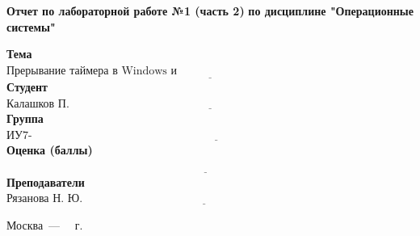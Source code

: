 \begin{titlepage}
	
	\begin{center}
		\Large\textbf{  Отчет по лабораторной работе №1 (часть 2)}\newline
		\textbf{по дисциплине "Операционные системы"}\newline\newline
	\end{center}
	
\noindent\textbf{Тема} $\underline{\text{Прерывание таймера в Windows и Unix~~~~~~~~~~~~~~~~~~~~~~~~~~~~~~~~~~~~~~~~~~~~~~~~~~~~~~~~~~~~~~~~~~~~}}$\newline\newline
\noindent\textbf{Студент} $\underline{\text{Калашков П. А.~~~~~~~~~~~~~~~~~~~~~~~~~~~~~~~~~~~~~~~~~~~~~~~~~~~~~~~~~~~~~~~~~~~~~~~~~~~~~~~~~~~~~~~~~~~~~~~}}$\newline\newline
\noindent\textbf{Группа} $\underline{\text{ИУ7-56Б~~~~~~~~~~~~~~~~~~~~~~~~~~~~~~~~~~~~~~~~~~~~~~~~~~~~~~~~~~~~~~~~~~~~~~~~~~~~~~~~~~~~~~~~~~~~~~~~~~~~~~~~~~~}}$\newline\newline
\noindent\textbf{Оценка (баллы)} $\underline{\text{~~~~~~~~~~~~~~~~~~~~~~~~~~~~~~~~~~~~~~~~~~~~~~~~~~~~~~~~~~~~~~~~~~~~~~~~~~~~~~~~~~~~~~~~~~~~~~~~~~~~~~~~~~}}$\newline\newline
\noindent\textbf{Преподаватели} $\underline{\text{Рязанова Н. Ю.~~~~~~~~~~~~~~~~~~~~~~~~~~~~~~~~~~~~~~~~~~~~~~~~~~~~~~~~~~~~~~~~~~~~~~~~~~~~~~~~~~~~~}}$\newline\newline\newline

	
	\begin{center}
		\vfill
		Москва~---~\the\year
		~г.
	\end{center}
	\restoregeometry
\end{titlepage}

